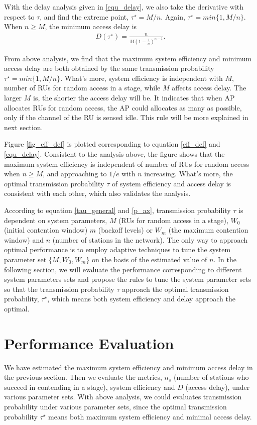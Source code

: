\documentclass[journal]{IEEEtran}
\begin{document}
With the delay analysis given in \ref{equ_delay}, we also take the derivative with respect to $\tau$, and find the extreme point, $\tau^\star = M/n$. Again, $\tau^\star = min\lbrace 1, M/n\rbrace$. 
When $n\geq M$, the minimum access delay is 
\begin{align}
\label{equ_min_delay}
D(\tau^\star) = \frac{n}{M(1-\frac{1}{n})^{n-1}}.
\end{align}

From above analysis, we find that the maximum system efficiency and minimum access delay are both obtained by the same transmission probability $\tau^\star = min\lbrace 1, M/n\rbrace$.
What's more, system efficiency is independent with $M$, number of RUs for random access in a stage, while $M$ affects access delay. 
The larger $M$ is, the shorter the access delay will be. 
It indicates that when AP allocates RUs for random access, the AP could allocates as many as possible, only if the channel of the RU is sensed idle. 
This rule will be more explained in next section.

Figure \ref{fig_eff_def} is plotted corresponding to equation \ref{eff_def} and \ref{equ_delay}.
Consistent to the analysis above, the figure shows that the maximum system efficiency is independent of number of RUs for random access when $n\geq M$, and approaching to $1/e$ with $n$ increasing. 
What's more, the optimal transmission probability $\tau$ of system efficiency and access delay is consistent with each other, which also validates the analysis. 

According to equation \ref{tau_general} and \ref{p_ax}, transmission probability $\tau$ is dependent on system parameters, $M$ (RUs for random access in a stage), $W_0$ (initial contention window) $m$ (backoff levels) or $W_m$ (the maximum contention window) and $n$ (number of stations in the network).
The only way to approach optimal performance is to employ adaptive techniques to tune the system parameter set $\lbrace M, W_0, W_m \rbrace$ on the basis of the estimated value of $n$.
In the following section, we will evaluate the performance corresponding to different system parameters sets and propose the rules to tune the system parameter sets so that the transmission probability $\tau$ approach the optimal transmission probability, $\tau^\star$, which means both system efficiency and delay approach the optimal. 

\section{Performance Evaluation} 	\label{sec_perf_eval}
We have estimated the maximum system efficiency and minimum access delay in the previous section. Then we evaluate the metrics, $n_s$ (number of stations who succeed in contending in a stage), system efficiency and $D$ (access delay), under various parameter sets. 
With above analysis, we could evaluates transmission probability under various parameter sets, since the optimal transmission probability $\tau^\star$ means both maximum system efficiency and minimal access delay.
\end{document}
